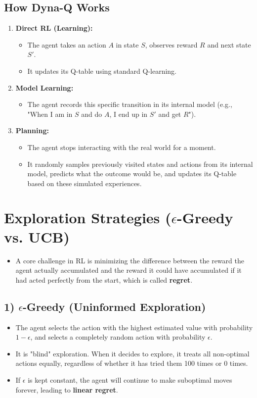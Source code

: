 \documentclass[12pt]{article}
\begin{document}
\subsection*{How Dyna-Q Works}
\begin{enumerate}
    \item \textbf{Direct RL (Learning):} 
    \begin{itemize}[label=$\circ$]
        \item The agent takes an action $A$ in state $S$, observes reward $R$ and next state $S'$.
        \item It updates its Q-table using standard Q-learning.
    \end{itemize}
    \item \textbf{Model Learning:} 
    \begin{itemize}[label=$\circ$]
        \item The agent records this specific transition in its internal model (e.g., "When I am in $S$ and do $A$, I end up in $S'$ and get $R$").
    \end{itemize}
    \item \textbf{Planning:} 
    \begin{itemize}[label=$\circ$]
        \item The agent stops interacting with the real world for a moment.
        \item It randomly samples previously visited states and actions from its internal model, predicts what the outcome would be, and updates its Q-table based on these simulated experiences.
    \end{itemize}
\end{enumerate}

\section*{Exploration Strategies ($\epsilon$-Greedy vs. UCB)}
\begin{itemize}[label=$\bullet$]
    \item A core challenge in RL is minimizing the difference between the reward the agent actually accumulated and the reward it could have accumulated if it had acted perfectly from the start, which is called \textbf{regret}.
\end{itemize}

\subsection*{1) $\epsilon$-Greedy (Uninformed Exploration)}
\begin{itemize}[label=$\bullet$]
    \item The agent selects the action with the highest estimated value with probability $1-\epsilon$, and selects a completely random action with probability $\epsilon$.
    \item It is "blind" exploration. When it decides to explore, it treats all non-optimal actions equally, regardless of whether it has tried them 100 times or 0 times.
    \item If $\epsilon$ is kept constant, the agent will continue to make suboptimal moves forever, leading to \textbf{linear regret}.
\end{itemize}
\end{document}
